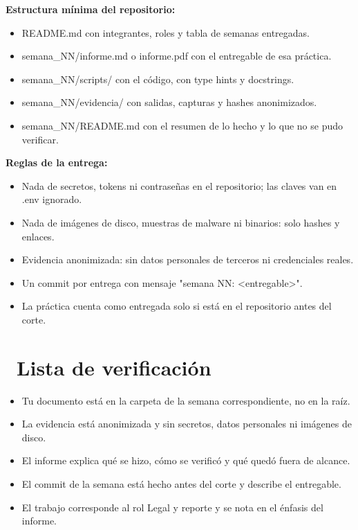 \documentclass[11pt,a4paper]{article}
\newcommand{\iconotexto}[2]{\textcolor{cyanNeon}{\faIcon{#1}}~#2}
\begin{document}
\textbf{Estructura mínima del repositorio:}

\begin{itemize}[leftmargin=1.4em,itemsep=2pt,topsep=3pt]
  \item README.md con integrantes, roles y tabla de semanas entregadas.
  \item semana\_NN/informe.md o informe.pdf con el entregable de esa práctica.
  \item semana\_NN/scripts/ con el código, con type hints y docstrings.
  \item semana\_NN/evidencia/ con salidas, capturas y hashes anonimizados.
  \item semana\_NN/README.md con el resumen de lo hecho y lo que no se pudo verificar.
\end{itemize}

\textbf{Reglas de la entrega:}

\begin{itemize}[leftmargin=1.4em,itemsep=2pt,topsep=3pt]
  \item Nada de secretos, tokens ni contraseñas en el repositorio; las claves van en .env ignorado.
  \item Nada de imágenes de disco, muestras de malware ni binarios: solo hashes y enlaces.
  \item Evidencia anonimizada: sin datos personales de terceros ni credenciales reales.
  \item Un commit por entrega con mensaje "semana NN: \textless{}entregable\textgreater{}".
  \item La práctica cuenta como entregada solo si está en el repositorio antes del corte.
\end{itemize}

\section{\iconotexto{clipboard-check}{Lista de verificación}}

\begin{itemize}[leftmargin=1.4em,itemsep=2pt,topsep=3pt]
  \item Tu documento está en la carpeta de la semana correspondiente, no en la raíz.
  \item La evidencia está anonimizada y sin secretos, datos personales ni imágenes de disco.
  \item El informe explica qué se hizo, cómo se verificó y qué quedó fuera de alcance.
  \item El commit de la semana está hecho antes del corte y describe el entregable.
  \item El trabajo corresponde al rol Legal y reporte y se nota en el énfasis del informe.
\end{itemize}
\end{document}
